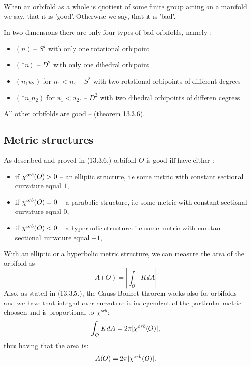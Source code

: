 When an orbifold as a whole is quotient of some finite group acting on a manifold we say, that 
it is 'good'. Otherwise we say, that it is 'bad'. 


In two dimensions there are only four types of bad orbifolds, namely
: 
\begin{itemize}
\item $(n)$ -- $S^2$ with only one rotational orbipoint 
\item $(*n)$ -- $D^2$ with only one dihedral orbipoint
\item $(n_1n_2)$ for $n_1 < n_2$ -- $S^2$ with two rotational orbipoints of different degrees 
\item $(*n_1n_2)$ for $n_1 < n_2$. -- $D^2$ with two dihedral orbipoints of differen degrees 
\end{itemize}
All other orbifolds are good -- \cite{Thurston1979} (theorem 13.3.6).

\subsection{Metric structures}
As described and proved in \cite{Thurston1979} (13.3.6.) orbifold $O$ 
is good iff 
have
either 
:
\begin{itemize}
\item if ${\chi^{orb}(O)} > 0$ -- an elliptic structure, i.e some metric with constant sectional 
curvature equal $1$,  
\item if ${\chi^{orb}(O)} = 0$ -- a parabolic structure, i.e some metric with constant sectional 
curvature equal $0$,
\item if ${\chi^{orb}(O)} < 0$ -- a hyperbolic structure. i.e some metric with constant sectional 
curvature equal $-1$,
\end{itemize}
With an elliptic or a hyperbolic metric structure, we can measure the area of the orbifold as 
\begin{equation}
A(O) = |\int_O K dA|
\end{equation} 
Also, as stated in \cite{Thurston1979} (13.3.5.), the Gauss-Bonnet 
theorem works also for orbifolds 
and we have that integral over curvature is independent of the particular metric choosen 
and is proportional to $\chi^{orb}$:
\begin{equation}
\int_O K dA = 2\pi|{\chi^{orb}(O)}|,
\end{equation}
thus having that the area is:
\begin{equation}\label{area to chi}
A(O) = 2\pi|{\chi^{orb}(O)}|.
\end{equation}

